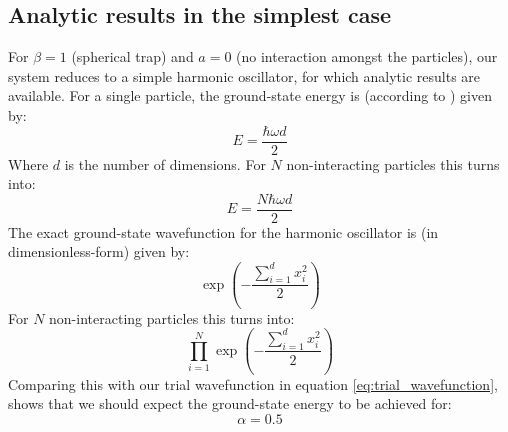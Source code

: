 \documentclass[a4paper, 10pt]{article}
\begin{document}
	\subsection{Analytic results in the simplest case}
	For $\beta=1$ (spherical trap) and $a=0$ (no interaction amongst the particles), our system reduces to a simple harmonic oscillator, for which analytic results are available. For a single particle, the ground-state energy is (according to \cite{Griffiths2004}) given by:
	\begin{equation}
	E=\frac{\hbar \omega d}{2}
	\end{equation}
	Where $d$ is the number of dimensions. For $N$ non-interacting particles this turns into:
	\begin{equation}\label{eq:Exact_Energy_N_particles}
	E=\frac{N\hbar \omega d}{2}
	\end{equation}
	The exact ground-state wavefunction for the harmonic oscillator is (in dimensionless-form) given by:
	\begin{equation}
	\exp\left(-\frac{\sum_{i=1}^d x_i^2}{2}\right)
	\end{equation}
	For $N$ non-interacting particles this turns into:
	\begin{equation}
	\prod_{i=1}^N 	\exp\left(-\frac{\sum_{i=1}^d x_i^2}{2}\right)
	\end{equation}
	Comparing this with our trial wavefunction in equation \ref{eq:trial_wavefunction}, shows that we should expect the ground-state energy to be achieved for:
	\begin{equation}\label{eq:exact_alpha}
	\alpha=0.5
	\end{equation}
\end{document}
